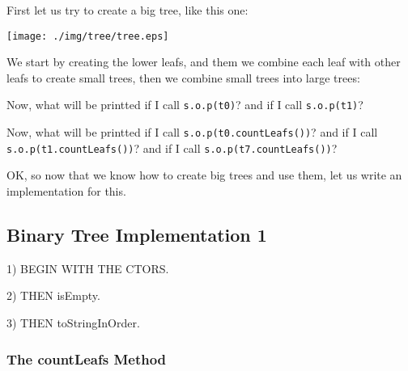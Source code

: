 \documentclass[a4paper, 9pt]{extarticle}
\begin{document}
First let us try to create a big tree, like this one:

\begin{center}
  \texttt{[image: ./img/tree/tree.eps]}
\end{center}

We start by creating the lower leafs, and them we combine each leaf with other
leafs to create small trees, then we combine small trees into large trees:

\begin{multicols}{2}
\end{multicols}

Now, what will be printted if I call \texttt{s.o.p(t0)}?
and if I call \texttt{s.o.p(t1)}?

Now, what will be printted if I call \texttt{s.o.p(t0.countLeafs())}?
and if I call \texttt{s.o.p(t1.countLeafs())}?
and if I call \texttt{s.o.p(t7.countLeafs())}?

OK, so now that we know how to create big trees and use them, let us write an
implementation for this.

\newpage
\subsection{Binary Tree Implementation 1}

\begin{multicols}{2}

  1) BEGIN WITH THE CTORS.

  2) THEN isEmpty.

  3) THEN toStringInOrder.
\end{multicols}



\newpage
\subsubsection{The countLeafs Method}

\begin{multicols}{2}
  \columnbreak
{}
\end{multicols}
\end{document}
